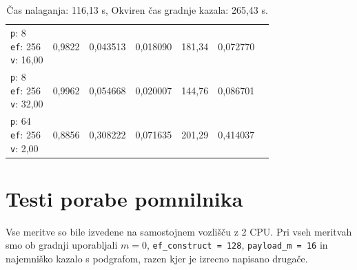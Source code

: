 \begin{table}[htbp]
\begin{tabularx}{\textwidth}{Xrrrrrr}
    \makecell{\texttt{p}: 8\\\texttt{ef}: 256\\\texttt{v}: 16,00} & 0,9822 & 0,043513 & 0,018090 & 181,34 & 0,072770 \\
    \makecell{\texttt{p}: 8\\\texttt{ef}: 256\\\texttt{v}: 32,00} & 0,9962 & 0,054668 & 0,020007 & 144,76 & 0,086701 \\
    \makecell{\texttt{p}: 64\\\texttt{ef}: 256\\\texttt{v}: 2,00} & 0,8856 & 0,308222 & 0,071635 & 201,29 & 0,414037 \\
    \bottomrule
  \end{tabularx}
\caption* {Čas nalaganja: 116,13 s, Okviren čas gradnje kazala: 265,43 s.}\end{table}


\clearpage

\section{Testi porabe pomnilnika}

Vse meritve so bile izvedene na samostojnem vozlišču z 2 CPU. Pri vseh meritvah smo ob gradnji uporabljali $m = 0$, \texttt{ef\_construct = 128}, \texttt{payload\_m = 16} in najemniško kazalo s podgrafom, razen kjer je izrecno napisano drugače.

